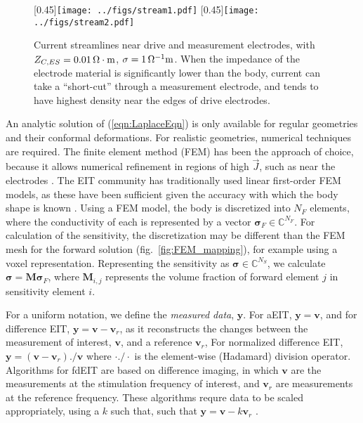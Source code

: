 \documentclass[12pt]{article} \usepackage[margin=3cm]{geometry} \usepackage[margin=20pt,font=small,labelfont=bf]{caption}\def\TBLWIDA{35mm}\def\TBLWIDB{95mm}
\newcommand\fref[1]{fig.\ \ref{#1}}
\newcommand{\yB}{\mathbf{y}}
\newcommand{\vB}{\mathbf{v}}
\newcommand{\MB}{\mathbf{M}}
\newcommand{\sG}{\bm{\sigma}}
\begin{document}
\begin{figure}
\centering
   [0.45\columnwidth]{\texttt{[image: ../figs/stream1.pdf]}}\hfil
   [0.45\columnwidth]{\texttt{[image: ../figs/stream2.pdf]}}\\
\caption{%
Current streamlines near drive and measurement electrodes, with
$Z_{C,ES} = 0.01\,\Omega\cdot{\rm m}$, $\sigma=1\,\Omega^{-1}{\rm m}$. When the
impedance of the electrode material is significantly lower than the 
body, current can take a ``short-cut'' through a measurement electrode,
and tends to have highest density near the edges of drive electrodes.
}
\label{fig:electrode_currents}
\end{figure}


An analytic solution of (\ref{eqn:LaplaceEqn}) is only available for
regular geometries and their conformal deformations. For realistic
geometries, numerical techniques are required. The finite element
method (FEM) has been the approach of choice, because it allows
numerical refinement in regions of high $\vec{J}$, such as
near the electrodes \cite{Grychtol2013Refinement}. The EIT community
has traditionally used linear first-order FEM models, as these
have been sufficient given the accuracy with which
the body shape is known \cite{Grychtol2012Mismatch}.
Using a FEM model, the body is discretized into $N_F$ elements,
where the conductivity of each is represented by a vector
$\sG_F \in \mathbb{C}^{N_F}$.
For calculation of the sensitivity, the discretization may
be different than the FEM mesh for the forward solution (\fref{fig:FEM_mapping}),
 for example using a voxel representation.
Representing the sensitivity as $\sG \in \mathbb{C}^{N_S}$, 
we calculate $\sG = \MB \sG_F$, where $\MB_{i,j}$
represents the volume fraction of forward element $j$ in
sensitivity element $i$.

For a uniform notation, we define the {\em measured data}, $\yB$.
For aEIT, $\yB = \vB$, and for
difference EIT, $\yB= \vB - \vB_r$, as it reconstructs
the changes 
between the measurement of interest, $\vB$, and a reference $\vB_r$,
For normalized difference EIT, $\yB= (\vB - \vB_r) ./ \vB$
where $\cdot ./ \cdot$ is the element-wise (Hadamard) division operator.
Algorithms for fdEIT are based on difference imaging, in which
$\vB$ are the measurements at the stimulation frequency of
interest, and
$\vB_r$ are measurements at the reference frequency. 
These algorithms requre data to be scaled appropriately,
using a $k$ such that,
such that $\yB= \vB - k \vB_r$ \cite{Seo2008fdEIT}.
\end{document}
